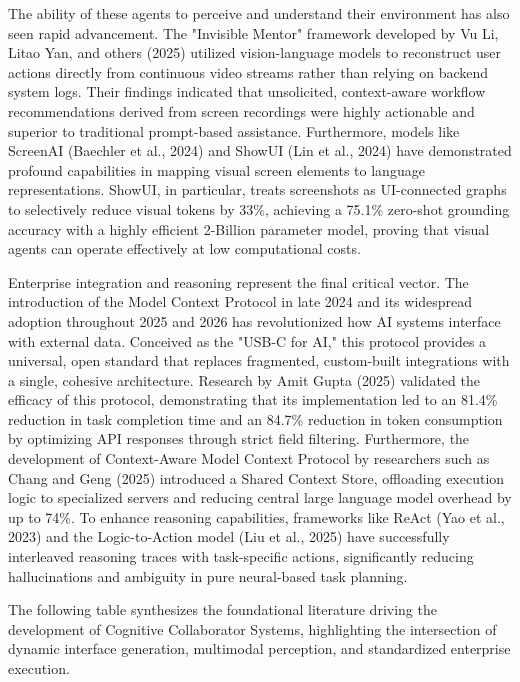 \documentclass[12pt, a4paper]{report}
\begin{document}
The ability of these agents to perceive and understand their environment has also seen rapid advancement. The "Invisible Mentor" framework developed by Vu Li, Litao Yan, and others (2025) utilized vision-language models to reconstruct user actions directly from continuous video streams rather than relying on backend system logs.\cite{hojo2025} Their findings indicated that unsolicited, context-aware workflow recommendations derived from screen recordings were highly actionable and superior to traditional prompt-based assistance.\cite{hojo2025} Furthermore, models like ScreenAI (Baechler et al., 2024) and ShowUI (Lin et al., 2024) have demonstrated profound capabilities in mapping visual screen elements to language representations.\cite{hojo2025} ShowUI, in particular, treats screenshots as UI-connected graphs to selectively reduce visual tokens by 33\%, achieving a 75.1\% zero-shot grounding accuracy with a highly efficient 2-Billion parameter model, proving that visual agents can operate effectively at low computational costs.\cite{hojo2025}

Enterprise integration and reasoning represent the final critical vector. The introduction of the Model Context Protocol in late 2024 and its widespread adoption throughout 2025 and 2026 has revolutionized how AI systems interface with external data.\cite{rootstack2026} Conceived as the "USB-C for AI," this protocol provides a universal, open standard that replaces fragmented, custom-built integrations with a single, cohesive architecture.\cite{thoughtworks2026} Research by Amit Gupta (2025) validated the efficacy of this protocol, demonstrating that its implementation led to an 81.4\% reduction in task completion time and an 84.7\% reduction in token consumption by optimizing API responses through strict field filtering.\cite{hojo2025} Furthermore, the development of Context-Aware Model Context Protocol by researchers such as Chang and Geng (2025) introduced a Shared Context Store, offloading execution logic to specialized servers and reducing central large language model overhead by up to 74\%.\cite{arxiv2601} To enhance reasoning capabilities, frameworks like ReAct (Yao et al., 2023) and the Logic-to-Action model (Liu et al., 2025) have successfully interleaved reasoning traces with task-specific actions, significantly reducing hallucinations and ambiguity in pure neural-based task planning.\cite{hojo2025}

The following table synthesizes the foundational literature driving the development of Cognitive Collaborator Systems, highlighting the intersection of dynamic interface generation, multimodal perception, and standardized enterprise execution.
\end{document}
